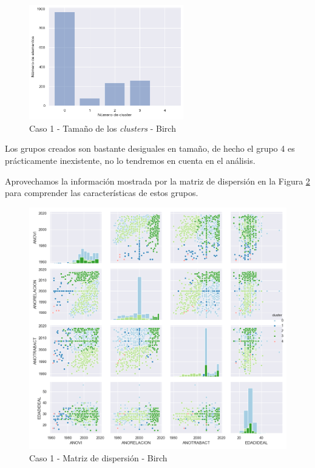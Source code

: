 \documentclass[a4paper, 20pt]{article}
\begin{document}
\begin{figure}[H]
    \centering
    \includegraphics[width=0.6\textwidth]{./caso1/Birch_tam_clusters}
    \caption{Caso 1 - Tamaño de los \textit{clusters} - Birch}
    \label{fig:birch_tam}
\end{figure}

Los grupos creados son bastante desiguales en tamaño, de hecho el grupo 4 es prácticamente inexistente, no lo tendremos en cuenta en el análisis.

Aprovechamos la información mostrada por la matriz de dispersión en la Figura \ref{fig:birch_scattermatrix} para comprender las características de estos grupos.

\begin{figure}[H]
    \centering
    \includegraphics[width=1\textwidth]{./caso1/Birch_scattermatrix}
    \caption{Caso 1 - Matriz de dispersión - Birch}
    \label{fig:birch_scattermatrix}
\end{figure}
\end{document}
